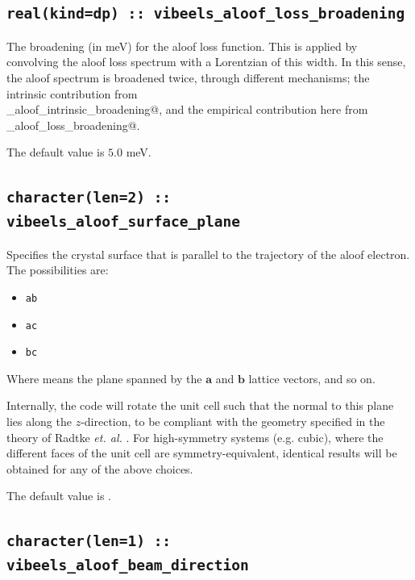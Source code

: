 \documentclass[a4paper,11pt,twoside]{book}
\begin{document}
{\subsection[vibeels\_aloof\_loss\_broadening]{\tt real(kind=dp) :: vibeels\_aloof\_loss\_broadening}

The broadening (in meV) for the aloof loss function. This is applied by convolving the aloof loss spectrum with a Lorentzian of this width. In this sense, the aloof spectrum is broadened twice, through different mechanisms; the intrinsic contribution from \\ \verb@vibeels_aloof_intrinsic_broadening@, and the empirical contribution here from \\ \verb@vibeels_aloof_loss_broadening@.

The default value is $5.0$ meV.

\subsection[vibeels\_aloof\_surface\_plane]{\tt character(len=2) :: vibeels\_aloof\_surface\_plane}

Specifies the crystal surface that is parallel to the trajectory of the aloof electron. The possibilities are:
\begin{itemize}
\item[{\bf --}]  \verb#ab#
\item[{\bf --}]  \verb#ac#
\item[{\bf --}]  \verb#bc#
\end{itemize}

Where \verb@ab@ means the plane spanned by the $\mathbf{a}$ and $\mathbf{b}$ lattice vectors, and so on.

Internally, the code will rotate the unit cell such that the normal to this plane lies along the $z$-direction, to be compliant with the geometry specified in the theory of Radtke \textit{et. al.} \cite{Radtke_et_al_2017}. For high-symmetry systems (e.g. cubic), where the different faces of the unit cell are symmetry-equivalent, identical results will be obtained for any of the above choices.

The default value is \verb@ab@.

\subsection[vibeels\_aloof\_beam\_direction]{\tt character(len=1) :: vibeels\_aloof\_beam\_direction}

}
\end{document}
